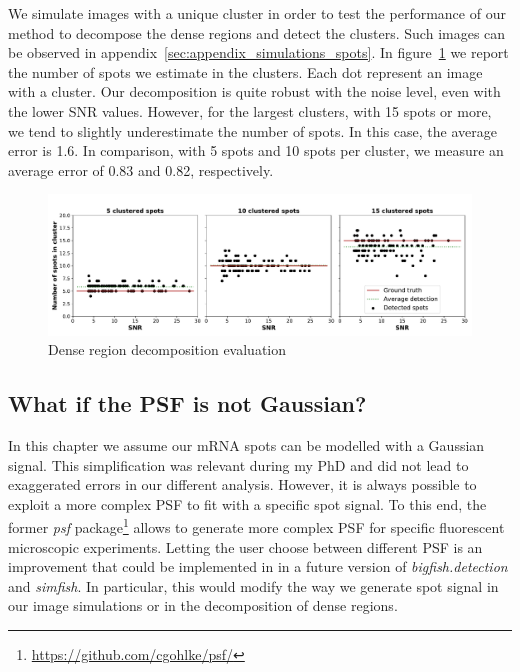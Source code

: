 We simulate images with a unique cluster in order to test the performance of our method to decompose the dense regions and detect the clusters.
Such images can be observed in appendix~\ref{sec:appendix_simulations_spots}.
In figure~\ref{fig:cluster_results} we report the number of spots we estimate in the clusters.
Each dot represent an image with a cluster.
Our decomposition is quite robust with the noise level, even with the lower \ac{SNR} values.
However, for the largest clusters, with 15 spots or more, we tend to slightly underestimate the number of spots.
In this case, the average error is 1.6.
In comparison, with 5 spots and 10 spots per cluster, we measure an average error of 0.83 and 0.82, respectively.

\begin{figure}[h]
    \centering
    \includegraphics[width=1\textwidth]{figures/chapter2/cluster_along_noise}
    \caption{Dense region decomposition evaluation}
    \label{fig:cluster_results}
\end{figure}

\subsection{What if the \ac{PSF} is not Gaussian?} \label{subsec:psf}

In this chapter we assume our \ac{mRNA} spots can be modelled with a Gaussian signal.
This simplification was relevant during my PhD and did not lead to exaggerated errors in our different analysis.
However, it is always possible to exploit a more complex \ac{PSF} to fit with a specific spot signal.
To this end, the former \emph{psf} package\footnote{\url{https://github.com/cgohlke/psf/}} allows to generate more complex \ac{PSF} for specific fluorescent microscopic experiments.
Letting the user choose between different \ac{PSF} is an improvement that could be implemented in in a future version of \emph{bigfish.detection} and \emph{simfish}.
In particular, this would modify the way we generate spot signal in our image simulations or in the decomposition of dense regions.

